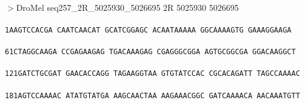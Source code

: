 \documentclass[11pt,twoside,reqno,a4paper]{article}
\begin{document}
\\
$>$DroMel	seq257\_2R\_5025930\_5026695	2R	5025930	5026695 \\
 \\
\texttt{1\hspace*{3\charwidth}AAGTCCACGA	CAATCAACAT	GCATCGGAGC	ACAATAAAAA	GGCAAAAGTG	GAAAGGAAGA	\\
\hspace*{4\charwidth}\hspace*{1\charwidth}\hspace*{1\charwidth}\hspace*{1\charwidth}\hspace*{1\charwidth}\hspace*{1\charwidth}\hspace*{1\charwidth}\\
61\hspace*{2\charwidth}CTAGGCAAGA	CCGAGAAGAG	TGACAAAGAG	CGAGGGCGGA	AGTGCGGCGA	GGACAAGGCT	\\
\hspace*{4\charwidth}\hspace*{1\charwidth}\hspace*{1\charwidth}\hspace*{1\charwidth}\hspace*{1\charwidth}\hspace*{1\charwidth}\hspace*{1\charwidth}\\
121\hspace*{1\charwidth}GATCTGCGAT	GAACACCAGG	TAGAAGGTAA	GTGTATCCAC	CGCACAGATT	TAGCCAAAAC	\\
\hspace*{4\charwidth}\hspace*{1\charwidth}\hspace*{1\charwidth}\hspace*{1\charwidth}\hspace*{1\charwidth}\hspace*{1\charwidth}\hspace*{1\charwidth}\\
181\hspace*{1\charwidth}AGTCCAAAAC	ATATGTATGA	AAGCAACTAA	AAGAAACGGC	GATCAAAACA	AACAAATGTT	\\
\hspace*{4\charwidth}\hspace*{1\charwidth}\hspace*{1\charwidth}\hspace*{1\charwidth}\hspace*{1\charwidth}\hspace*{1\charwidth}\hspace*{1\charwidth}\\
}
\end{document}
